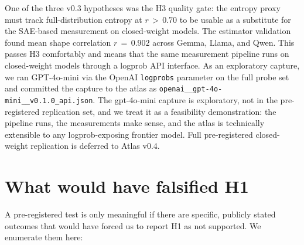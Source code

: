\documentclass[11pt,letterpaper]{article}
\begin{document}
One of the three v0.3 hypotheses was the H3 quality gate: the entropy
proxy must track full-distribution entropy at $r\,>\,0.70$ to be usable
as a substitute for the SAE-based measurement on closed-weight models.
The estimator validation found mean shape correlation $r\,=\,0.902$
across Gemma, Llama, and Qwen. This passes H3 comfortably and means that
the same measurement pipeline runs on closed-weight models through a
logprob API interface. As an exploratory capture, we ran GPT-4o-mini via
the OpenAI \texttt{logprobs} parameter on the full probe set and committed
the capture to the atlas as \texttt{openai\_\_gpt-4o-mini\_\_v0.1.0\_api.json}.
The gpt-4o-mini capture is exploratory, not in the pre-registered replication
set, and we treat it as a feasibility demonstration: the pipeline runs, the
measurements make sense, and the atlas is technically extensible to any
logprob-exposing frontier model. Full pre-registered closed-weight
replication is deferred to Atlas v0.4.

\section{What would have falsified H1}
\label{sec:falsify}

A pre-registered test is only meaningful if there are specific, publicly
stated outcomes that would have forced us to report H1 as not supported.
We enumerate them here:
\end{document}
